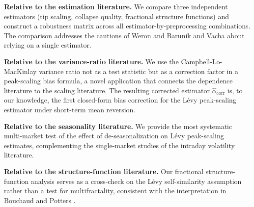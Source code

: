 \documentclass[12pt,a4paper]{article}
\begin{document}
\textbf{Relative to the estimation literature.} We compare three
independent estimators (tip scaling, collapse quality, fractional structure
functions) and construct a robustness matrix across all estimator-by-preprocessing
combinations. The comparison addresses the cautions of Weron \cite{Weron2001}
and Barunik and Vacha \cite{Barunik2010} about relying on a single estimator.

\textbf{Relative to the variance-ratio literature.} We use the
Campbell-Lo-MacKinlay variance ratio not as a test statistic but as a
correction factor in a peak-scaling bias formula, a novel application that
connects the dependence literature to the scaling literature. The resulting
corrected estimator $\hat\alpha_{\mathrm{corr}}$ is, to our knowledge, the
first closed-form bias correction for the Lévy peak-scaling estimator under
short-term mean reversion.

\textbf{Relative to the seasonality literature.} We provide the most
systematic multi-market test of the effect of de-seasonalization on Lévy
peak-scaling estimates, complementing the single-market studies of the
intraday volatility literature.

\textbf{Relative to the structure-function literature.} Our fractional
structure-function analysis serves as a cross-check on the Lévy
self-similarity assumption rather than a test for multifractality, consistent
with the interpretation in Bouchaud and Potters \cite{BouchaudPotters2003}.




\end{document}
